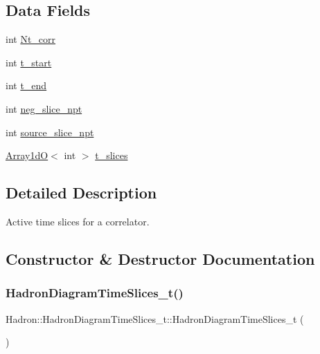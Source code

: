 \subsection*{Data Fields}
\begin{DoxyCompactItemize}
\item 
int \mbox{\hyperlink{structHadron_1_1HadronDiagramTimeSlices__t_ac1d948597af1c4afc74c5fbe6b58e1fc}{Nt\+\_\+corr}}
\item 
int \mbox{\hyperlink{structHadron_1_1HadronDiagramTimeSlices__t_ace776097f7b2bb23862493b7e5621002}{t\+\_\+start}}
\item 
int \mbox{\hyperlink{structHadron_1_1HadronDiagramTimeSlices__t_a677258946704e301f768fb0b629cf1a1}{t\+\_\+end}}
\item 
int \mbox{\hyperlink{structHadron_1_1HadronDiagramTimeSlices__t_a1740529fd16ed90f5ef6080aaf1e93a5}{neg\+\_\+slice\+\_\+npt}}
\item 
int \mbox{\hyperlink{structHadron_1_1HadronDiagramTimeSlices__t_a89cdd4482372015949fd47b0eb69f500}{source\+\_\+slice\+\_\+npt}}
\item 
\mbox{\hyperlink{classADAT_1_1Array1dO}{Array1dO}}$<$ int $>$ \mbox{\hyperlink{structHadron_1_1HadronDiagramTimeSlices__t_a870700ce888c6a61a69bd1bb8b935ac0}{t\+\_\+slices}}
\end{DoxyCompactItemize}


\subsection{Detailed Description}
Active time slices for a correlator. 

\subsection{Constructor \& Destructor Documentation}
\mbox{\label{structHadron_1_1HadronDiagramTimeSlices__t_a2c90aaaf0112e21e3c3f065ac2d32682}} 
\subsubsection{\texorpdfstring{HadronDiagramTimeSlices\_t()}{HadronDiagramTimeSlices\_t()}\hspace{0.1cm}{\footnotesize\ttfamily [1/2]}}
{\footnotesize\ttfamily Hadron\+::\+Hadron\+Diagram\+Time\+Slices\+\_\+t\+::\+Hadron\+Diagram\+Time\+Slices\+\_\+t (\begin{DoxyParamCaption}{ }\end{DoxyParamCaption})\hspace{0.3cm}{\ttfamily [inline]}}

